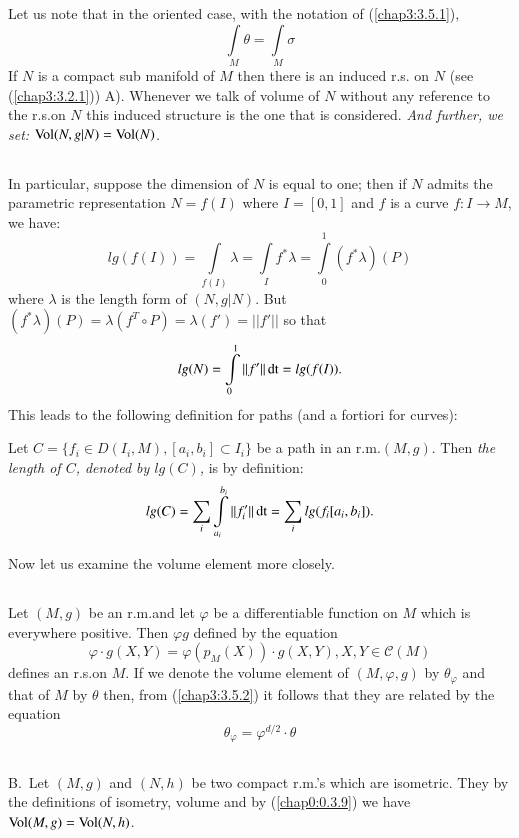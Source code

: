 Let us note that in the oriented case, with the notation of
(\ref{chap3:3.5.1}),
$$
\int\limits_{M}\theta =\int\limits_{M}\sigma
$$
If $N$ is a compact sub manifold of $M$ then there is an induced r.s.\@
on $N$ (see (\ref{chap3:3.2.1})) A). Whenever we talk of volume of $N$
without any reference to the r.s.\@ on $N$ this induced structure is
the one that is considered. {\em And further, we set:
  $\operatorname{Vol}(N,g|N)=\operatorname{Vol}(N)$.}

\subsection{}\label{chap3:3.5.3}

In particular, suppose the dimension of $N$ is equal to one; then if
$N$ admits the parametric representation $N=f(I)$ where $I=[0,1]$ and
$f$ is a curve $f:I\to M$, we have:
$$
lg(f(I))=\int\limits_{f(I)}\lambda=\int\limits_{I}f^{\ast}\lambda =
\int\limits^{1}_{0}(f^{\ast}\lambda)(P)  
$$
where \pageoriginale $\lambda$ is the length form of $(N,g|N)$. But 
$(f^{\ast}\lambda)(P)=\lambda(f^{T}\circ P)= \lambda(f')=||f'||$ so
that
$$
lg(N)=\int\limits^{1}_{0}||f'||\operatorname{dt}=lg(f(I)).
$$
This leads to the following definition for paths (and a fortiori for
curves):

\begin{defi*}
Let $C=\{f_{i}\in D(I_{i},M), [a_{i},b_{i}]\subset I_{i}\}$ be a path
in an r.m.\@ $(M,g)$. Then {\em the length of $C$, denoted by $lg(C)$,}
is by definition:
$$
lg(C) = \sum_{i}\int\limits^{b_{i}}_{a_{i}} ||
f'_{i}||\operatorname{dt}=\sum_{i}lg(f_{i}[a_{i},b_{i}]).  
$$
\end{defi*}

Now let us examine the volume element more closely.

\subsection{}\label{chap3:3.5.4}

Let $(M,g)$ be an r.m.\@ and let $\varphi$ be a differentiable
function on $M$ which is everywhere positive. Then $\varphi g$ defined
by the equation
$$
\varphi\cdot g(X,Y)=\varphi(p_{M}(X))\cdot g(X,Y),X,Y\in\mathscr{C}(M)
$$
defines an r.s.\@ on $M$. If we denote the volume element of
$(M,\varphi,g)$ by $\theta_{\varphi}$ and that of $M$ by $\theta$
then, from (\ref{chap3:3.5.2}) it follows that they are related by the
equation
$$
\theta_{\varphi}=\varphi^{d/2}\cdot\theta
$$

\subsection{}\label{chap3:3.5.5}
B.~Let $(M,g)$ and $(N,h)$ be two compact r.m.'s which are
isometric. They by the definitions of isometry, volume and by
(\ref{chap0:0.3.9}) we have $\operatorname{Vol}(M,g)=\operatorname{Vol}(N,h)$.


